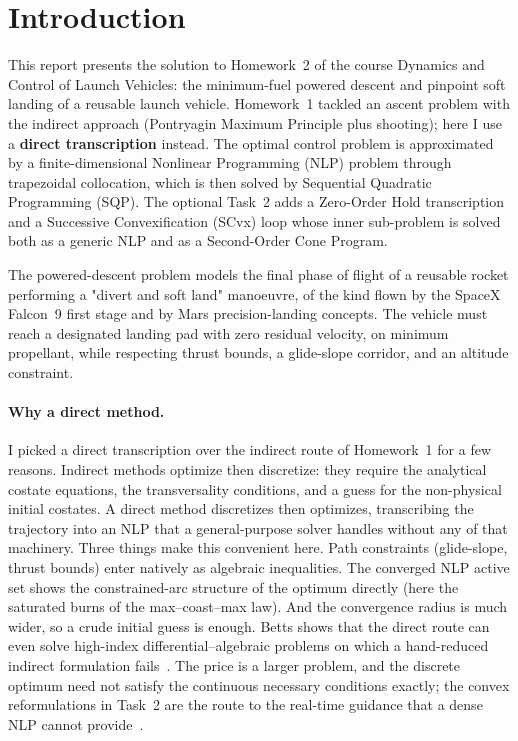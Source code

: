 \documentclass[../main.tex]{subfiles}
\begin{document}
\section{Introduction}\label{sec:introduction}

This report presents the solution to Homework~2 of the course Dynamics and Control of Launch Vehicles: the minimum-fuel powered descent and pinpoint soft landing of a reusable launch vehicle. Homework~1 tackled an ascent problem with the indirect approach (Pontryagin Maximum Principle plus shooting); here I use a \textbf{direct transcription} instead. The optimal control problem is approximated by a finite-dimensional Nonlinear Programming (NLP) problem through trapezoidal collocation, which is then solved by Sequential Quadratic Programming (SQP). The optional Task~2 adds a Zero-Order Hold transcription and a Successive Convexification (SCvx) loop whose inner sub-problem is solved both as a generic NLP and as a Second-Order Cone Program.

The powered-descent problem models the final phase of flight of a reusable rocket performing a "divert and soft land" manoeuvre, of the kind flown by the SpaceX Falcon~9 first stage and by Mars precision-landing concepts. The vehicle must reach a designated landing pad with zero residual velocity, on minimum propellant, while respecting thrust bounds, a glide-slope corridor, and an altitude constraint.

\paragraph{Why a direct method.} I picked a direct transcription over the indirect route of Homework~1 for a few reasons. Indirect methods optimize then discretize: they require the analytical costate equations, the transversality conditions, and a guess for the non-physical initial costates. A direct method discretizes then optimizes, transcribing the trajectory into an NLP that a general-purpose solver handles without any of that machinery. Three things make this convenient here. Path constraints (glide-slope, thrust bounds) enter natively as algebraic inequalities. The converged NLP active set shows the constrained-arc structure of the optimum directly (here the saturated burns of the max--coast--max law). And the convergence radius is much wider, so a crude initial guess is enough. Betts shows that the direct route can even solve high-index differential--algebraic problems on which a hand-reduced indirect formulation fails~\cite[Sec.~4.12.7]{betts2010}. The price is a larger problem, and the discrete optimum need not satisfy the continuous necessary conditions exactly; the convex reformulations in Task~2 are the route to the real-time guidance that a dense NLP cannot provide~\cite{benedikter2022}.
\end{document}
